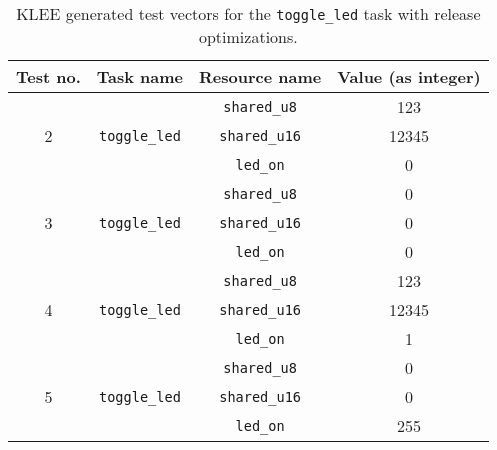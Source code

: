 \begin{table}[H]
    \centering
    \begin{longtable}{|c|c|c|c|}
    \hline
    Test no. & Task name & Resource name & Value (as integer) \\ \hline
    \multirow{3}{*}{2} & \multirow{3}{*}{\texttt{toggle\_led}} & \texttt{shared\_u8}  & 123 \\ \cline{3-4} 
                       &                                       & \texttt{shared\_u16} & 12345 \\ \cline{3-4} 
                       &                                       & \texttt{led\_on}     & 0 \\ \hline
    \multirow{3}{*}{3} & \multirow{3}{*}{\texttt{toggle\_led}} & \texttt{shared\_u8}  & 0 \\ \cline{3-4} 
                       &                                       & \texttt{shared\_u16} & 0 \\ \cline{3-4} 
                       &                                       & \texttt{led\_on}     & 0 \\ \hline
    \multirow{3}{*}{4} & \multirow{3}{*}{\texttt{toggle\_led}} & \texttt{shared\_u8}  & 123 \\ \cline{3-4} 
                       &                                       & \texttt{shared\_u16} & 12345 \\ \cline{3-4} 
                       &                                       & \texttt{led\_on}     & 1 \\ \hline
    \multirow{3}{*}{5} & \multirow{3}{*}{\texttt{toggle\_led}} & \texttt{shared\_u8}  & 0 \\ \cline{3-4} 
                       &                                       & \texttt{shared\_u16} & 0 \\ \cline{3-4} 
                       &                                       & \texttt{led\_on}     & 255 \\ \hline
    \end{longtable}
    \caption{KLEE generated test vectors for the \texttt{toggle\_led} task with release optimizations.}
    \label{tab:evalreleaseteststoggle}
\end{table}


